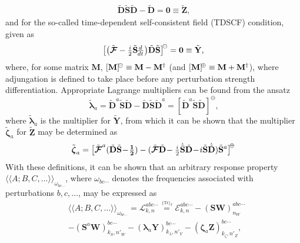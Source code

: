 \documentclass[%
 reprint,
 amsmath,amssymb,
 aps,
]{revtex4-1}
\begin{document}
\begin{eqnarray}\label{idempotency}
\tilde{\mathbf{D}} \tilde{\mathbf{S}} \tilde{\mathbf{D}} - \tilde{\mathbf{D}} = \mathbf{0} \equiv \tilde{\mathbf{Z}}
\text{,}
\end{eqnarray}
and for the so-called time-dependent self-consistent field (TDSCF) condition, given as
\begin{eqnarray}\label{TDSCF}
\bigr[\bigl(\tilde{\mbox{\boldmath $ \mathcal{F} $}} - {\textstyle \frac{i}{2}} \tilde{\mathbf{S}} 
\!{\textstyle \frac{d}{dt}} \bigr) \tilde{\mathbf{D}} \tilde{\mathbf{S}} \bigr]^{\negmedspace\circleddash} = \mathbf{0} \equiv \tilde{\mathbf{Y}}
\text{,}
\end{eqnarray}
where, for some matrix $\mathbf{M}$, $[\mathbf{M}]^{\negmedspace\circleddash} \equiv \mathbf{M} - \mathbf{M}^{\dagger}$ (and $[\mathbf{M}]^{\negmedspace\oplus} \equiv \mathbf{M} + \mathbf{M}^{\dagger}$), where adjungation is defined to take place before any perturbation  strength differentiation. 
Appropriate Lagrange multipliers can be found from the ansatz
\begin{equation}
\tilde{\bm{\lambda}}_a = \tilde{\mathbf{D}}^{a}\tilde{\mathbf{S}} \tilde{\mathbf{D}}-\tilde{\mathbf{D}} \tilde{\mathbf{S}} \tilde{\mathbf{D}}^{a}=[\tilde{\mathbf{D}}^{a}\tilde{\mathbf{S}} \tilde{\mathbf{D}}]^{\!\ominus} \label{LagrMulXg} \text{,}
\end{equation}
where $\tilde{\bm{\lambda}}_{a}$ is the multiplier for $\tilde{\mathbf{Y}}$, from which it can be shown  that the multiplier $\tilde{\bm{\zeta}}_a$ for $\tilde{\mathbf{Z}}$ may be determined as
\begin{equation}
\tilde{\mbox{\boldmath $ \zeta $}}_a=\bigl[\tilde{\mbox{\boldmath $ \mathcal{F} $}}^{a}(\tilde{\mathbf{D}} \tilde{\mathbf{S}}\!-\!{\textstyle \mathbf{\frac{1}{2}}})-(\tilde{\mbox{\boldmath $ \mathcal{F} $}} \tilde{\mathbf{D}}\!-{\textstyle \frac{i}{2}}\dot{\tilde{\mathbf{S}}} \tilde{\mathbf{D}}
\!-\! i\tilde{\mathbf{S}} \dot{\tilde{\mathbf{D}}})\tilde{\mathbf{S}}^{a}\bigr]^{\negmedspace\oplus}\label{LagrMulLg}
\end{equation}
With these definitions, it can be shown  that an arbitrary response property $\langle \langle A ; B, C, \ldots \rangle \rangle_{\omega_{bc\cdots}}$, where $\omega_{bc\cdots}$ denotes the frequencies associated with perturbations $b, c, \ldots$, may be expressed as
\begin{equation}\label{master}
\begin{split}
& \langle \langle A ; B, C, \ldots \rangle \rangle_{\omega_{bc\cdots}} = \mathcal{L}_{k,n}^{abc\cdots} \stackrel{\,^{\{\mathrm{Tr}\}_T}}{=} 
 \mathcal{E}_{k,n}^{abc\cdots} - (\mathbf{SW})_{n_{W}}^{abc\cdots} \\ & - (\mathbf{S}^{a}\mathbf{W})_{k_{S},n'_{W}}^{bc\cdots} - (\mathbf{\lambda}_{a}\mathbf{Y})_{k_{\lambda},n'_{Y}}^{bc\cdots} - (\mathbf{\zeta}_{a}\mathbf{Z})_{k_{\zeta},n'_{Z}}^{bc\cdots}\text{,}
\end{split}
\end{equation}
\end{document}
